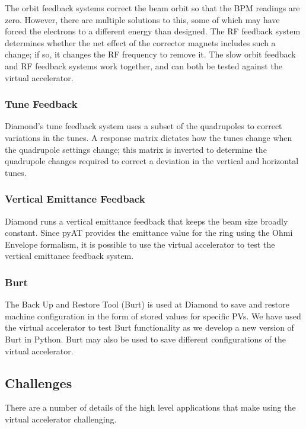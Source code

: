 \documentclass[a4paper,
               keeplastbox,   %
               ]{jacow}
\begin{document}
The orbit feedback systems correct the beam orbit so that the BPM readings are zero.
However, there are multiple solutions to this, some of which may have forced the
electrons to a different energy than designed. The RF feedback system determines
whether the net effect of the corrector magnets includes such a change; if so, it
changes the RF frequency to remove it. The slow orbit feedback and RF feedback 
systems work together, and can both be tested against the virtual accelerator.

\subsubsection{Tune Feedback}

Diamond's tune feedback system \cite{feedbacks} uses a subset of the quadrupoles 
to correct variations in the tunes. A response matrix dictates how the tunes 
change when the quadrupole settings change; this matrix is inverted to determine 
the quadrupole changes required to correct a deviation in the vertical and 
horizontal tunes.

\subsubsection{Vertical Emittance Feedback}

Diamond runs a vertical emittance feedback that keeps the beam size broadly constant.
Since pyAT provides the emittance value for the ring using the Ohmi Envelope formalism,
it is possible to use the virtual accelerator to test the vertical emittance feedback
system.

\subsubsection{Burt}

The Back Up and Restore Tool (Burt) is used at Diamond to save and restore machine
configuration in the form of stored values for specific PVs. We have used the virtual
accelerator to test Burt functionality as we develop a new version of Burt in Python.
Burt may also be used to save different configurations of the virtual accelerator.

\subsection{Challenges}

There are a number of details of the high level applications that make using the
virtual accelerator challenging.
\end{document}
